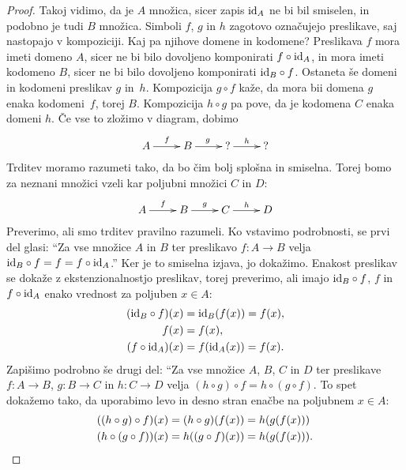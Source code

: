 \begin{proof}
  Takoj vidimo, da je $A$ množica, sicer zapis $\id[A]$ ne bi bil smiselen, in podobno je
  tudi $B$ množica. Simboli $f$, $g$ in $h$ zagotovo označujejo preslikave, saj nastopajo
  v kompoziciji. Kaj pa njihove domene in kodomene? Preslikava $f$ mora imeti domeno $A$,
  sicer ne bi bilo dovoljeno komponirati $f \circ \id[A]$, in mora imeti kodomeno $B$,
  sicer ne bi bilo dovoljeno komponirati $\id[B] \circ f$. Ostaneta še domeni in kodomeni
  preslikav $g$ in~$h$. Kompozicija $g \circ f$ kaže, da mora bii domena $g$ enaka
  kodomeni~$f$, torej $B$. Kompozicija $h \circ g$ pa pove, da je kodomena $C$ enaka
  domeni $h$. Če vse to zložimo v diagram, dobimo
  \begin{equation*}
    \xymatrix{
      {A} \ar[r]^{f}
      &
      {B} \ar[r]^{g}
      &
      {\text{?}} \ar[r]^{h}
      &
      {\text{?}}
    }
  \end{equation*}
  Trditev moramo razumeti tako, da bo čim bolj splošna in smiselna. Torej bomo za neznani
  množici vzeli kar poljubni množici $C$ in $D$:
  \begin{equation*}
    \xymatrix{
      {A} \ar[r]^{f}
      &
      {B} \ar[r]^{g}
      &
      {C} \ar[r]^{h}
      &
      {D}
    }
  \end{equation*}
  Preverimo, ali smo trditev pravilno razumeli. Ko vstavimo podrobnosti, se prvi del
  glasi: ``Za vse množice $A$ in $B$ ter preslikavo $f : A \to B$ velja
  $\id[B] \circ f = f = f \circ \id[A]$.''
  Ker je to smiselna izjava, jo dokažimo. Enakost preslikav se dokaže z ekstenzionalnostjo
  preslikav, torej preverimo, ali imajo $\id[B] \circ f$, $f$ in $f \circ \id[A]$ enako
  vrednost za poljuben $x \in A$:
  \begin{align*}
    (\id[B] \circ f)(x) &= \id[B] (f (x)) = f (x), \\
    f (x) &= f(x), \\
    (f \circ \id[A])(x) &= f (\id[A](x)) = f(x).\\
  \end{align*}
  Zapišimo podrobno še drugi del: ``Za vse množice $A$, $B$, $C$ in $D$ ter preslikave
  $f : A \to B$, $g : B \to C$ in $h : C \to D$ velja
  $(h \circ g) \circ f = h \circ (g \circ f)$. To spet dokažemo tako, da uporabimo levo in
  desno stran enačbe na poljubnem $x \in A$:
  \begin{align*}
    ((h \circ g) \circ f)(x) &= (h \circ g)(f(x)) = h(g(f(x))) \\
    (h \circ (g \circ f))(x) &= h((g \circ f)(x)) = h(g(f(x))). \qedhere
  \end{align*}
\end{proof}


